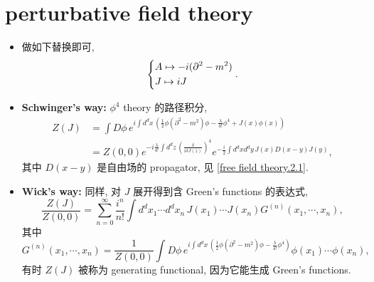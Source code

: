 \section{perturbative field theory}
\begin{itemize}
	\item 做如下替换即可,
	\begin{equation}
		\begin{dcases}
			A \mapsto - i (\partial^2 - m^2) \\
			J \mapsto i J
		\end{dcases}.
	\end{equation}
	
	\item \textbf{Schwinger's way:} $\phi^4$ theory 的路径积分,
	\begin{align}
		Z(J) &= \int D\phi \, e^{i \int d^d x \, (\frac{1}{2} \phi (\partial^2 - m^2) \phi - \frac{\lambda}{4!} \phi^4 + J(x) \phi(x))} \\
		&= Z(0, 0) e^{- i \frac{\lambda}{4!} \int d^d z \, (\frac{\delta}{i \delta J(z)})^4} e^{- \frac{i}{2} \int d^d x d^d y \, J(x) D(x - y) J(y)},
	\end{align}
	其中 $D(x - y)$ 是自由场的 propagator, 见 \eqref{free field theory.2.1}.
	
	\item \textbf{Wick's way:} 同样, 对 $J$ 展开得到含 Green's functions 的表达式,
	\begin{equation}
		\frac{Z(J)}{Z(0, 0)} = \sum_{n = 0}^\infty \frac{i^n}{n!} \int d^d x_1 \cdots d^d x_n \, J(x_1) \cdots J(x_n) G^{(n)}(x_1, \cdots, x_n),
	\end{equation}
	其中
	\begin{equation} \label{Feynman diagrams.3.5}
		G^{(n)}(x_1, \cdots, x_n) = \frac{1}{Z(0, 0)} \int D\phi \, e^{i \int d^d x \, (\frac{1}{2} \phi (\partial^2 - m^2) \phi - \frac{\lambda}{4!} \phi^4)} \phi(x_1) \cdots \phi(x_n),
	\end{equation}
	有时 $Z(J)$ 被称为 generating functional, 因为它能生成 Green's functions.
\end{itemize}

